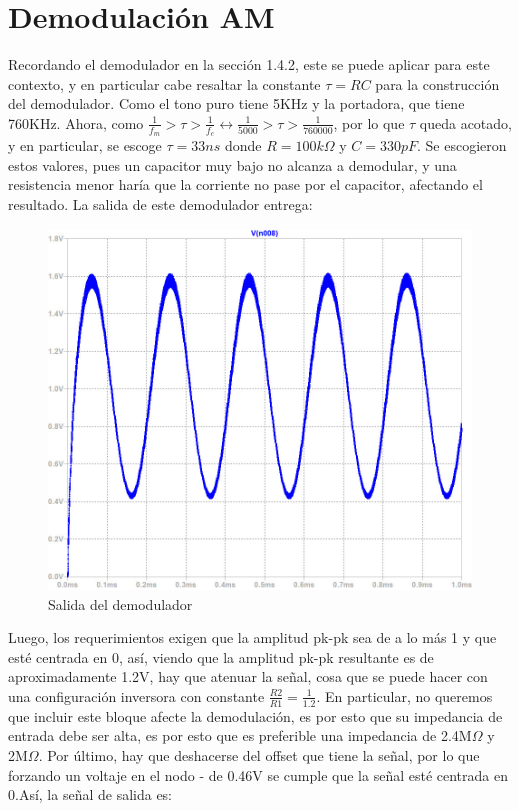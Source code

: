 \section{Demodulación AM}
Recordando el demodulador en la sección 1.4.2, este se puede aplicar para este contexto, y en particular cabe resaltar la constante $\tau = RC$ para la construcción del demodulador. Como el tono puro tiene 5KHz y la portadora, que tiene 760KHz. Ahora, como $\frac{1}{f_m}>\tau>\frac{1}{f_c} \longleftrightarrow \frac{1}{5000}>\tau > \frac{1}{760000}$, por lo que $\tau$ queda acotado, y en particular, se escoge $\tau = 33ns$ donde $R = 100k\Omega$ y $C = 330pF$. Se escogieron estos valores, pues un capacitor muy bajo no alcanza a demodular, y una resistencia menor haría que la corriente no pase por el capacitor, afectando el resultado. La salida de este demodulador entrega:

\begin{figure}[ht!]
    \centering
    \includegraphics[width=0.75\linewidth]{img/Salida demodulador.jpg}
    \caption{Salida del demodulador}
    \label{fig:demod_output}
\end{figure}

Luego, los requerimientos exigen que la amplitud pk-pk sea de a lo más 1 y que esté centrada en 0, así, viendo que la amplitud pk-pk resultante es de aproximadamente 1.2V, hay que atenuar la señal, cosa que se puede hacer con una configuración inversora con constante $\frac{R2}{R1}=\frac{1}{1.2}$. En particular, no queremos que incluir este bloque afecte la demodulación, es por esto que su impedancia de entrada debe ser alta, es por esto que es preferible una impedancia de 2.4M$\Omega$ y 2M$\Omega$. Por último, hay que deshacerse del offset que tiene la señal, por lo que forzando un voltaje en el nodo - de 0.46V se cumple que la señal esté centrada en 0.Así, la señal de salida es:


